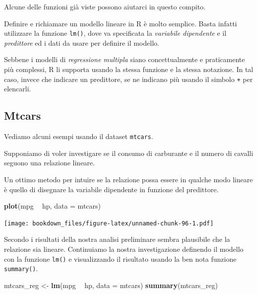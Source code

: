\documentclass[]{book}
\newenvironment{Shaded}{\begin{snugshade}}{\end{snugshade}}
\newcommand{\DataTypeTok}[1]{\textcolor[rgb]{0.13,0.29,0.53}{#1}}
\newcommand{\KeywordTok}[1]{\textcolor[rgb]{0.13,0.29,0.53}{\textbf{#1}}}
\newcommand{\NormalTok}[1]{#1}
\newcommand{\OperatorTok}[1]{\textcolor[rgb]{0.81,0.36,0.00}{\textbf{#1}}}
\newcommand{\StringTok}[1]{\textcolor[rgb]{0.31,0.60,0.02}{#1}}
\begin{document}
Alcune delle funzioni già viste possono aiutarci in questo compito.

Definire e richiamare un modello lineare in R è molto semplice. Basta infatti utilizzare la funzione \texttt{lm()}, dove va specificata la \emph{variabile dipendente} e il \emph{predittore} ed i dati da usare per definire il modello.

Sebbene i modelli di \emph{regressione multipla} siano concettualmente e praticamente più complessi, R li supporta usando la stessa funzione e la stessa notazione. In tal caso, invece che indicare un predittore, se ne indicano più usando il simbolo \texttt{+} per elencarli.

\hypertarget{mtcars}{%
\subsection{Mtcars}\label{mtcars}}

Vediamo alcuni esempi usando il dataset \texttt{mtcars}.

Supponiamo di voler investigare se il consumo di carburante e il numero di cavalli seguono una relazione lineare.

Un ottimo metodo per intuire se la relazione possa essere in qualche modo lineare è quello di disegnare la variabile dipendente in funzione del predittore.

\begin{Shaded}
\begin{Highlighting}[]
\KeywordTok{plot}\NormalTok{(mpg }\OperatorTok{~}\StringTok{ }\NormalTok{hp, }\DataTypeTok{data =}\NormalTok{ mtcars)}
\end{Highlighting}
\end{Shaded}

\texttt{[image: bookdown\_files/figure-latex/unnamed-chunk-96-1.pdf]}

Secondo i risultati della nostra analisi preliminare sembra plausibile che la relazione sia lineare. Continuiamo la nostra investigazione definendo il modello con la funzione \texttt{lm()} e visualizzando il risultato usando la ben nota funzione \texttt{summary()}.

\begin{Shaded}
\begin{Highlighting}[]
\NormalTok{mtcars_reg <-}\StringTok{ }\KeywordTok{lm}\NormalTok{(mpg }\OperatorTok{~}\StringTok{ }\NormalTok{hp, }\DataTypeTok{data =}\NormalTok{ mtcars)}
\KeywordTok{summary}\NormalTok{(mtcars_reg)}
\end{Highlighting}
\end{Shaded}
\end{document}
